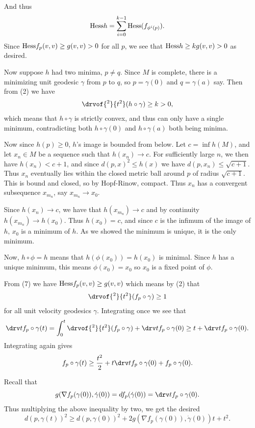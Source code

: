     And thus
    $$ {\rm Hess} h = \sum_{i=0}^{k-1}{\rm Hess}(f_{\phi^i(p)}) . $$
    Since ${\rm Hess} f_p(v,v)\geq g(v,v)>0$ for all $p$, we see that ${\rm Hess} h\geq kg(v,v)>0$ as desired.

    Now suppose $h$ had two minima, $p\neq q$.
    Since $M$ is complete, there is a minimizing unit geodesic $\gamma$ from $p$ to $q$, so $p=\gamma(0)$ and $q=\gamma(a)$
    say.
    Then from (2) we have
    $$ \drvof{^2}{t^2}(h\circ\gamma) \geq k > 0 , $$
    which means that $h\circ\gamma$ is strictly convex, and thus can only have a single minimum,
    contradicting both $h\circ\gamma(0)$ and $h\circ\gamma(a)$ both being minima.

    Now since $h(p)\geq0$, $h$'s image is bounded from below.
    Let $c=\inf h(M)$, and let $x_n\in M$ be a sequence such that $h(x_n)\to c$.
    For sufficiently large $n$, we then have $h(x_n)<c+1$, and since $d(p,x)^2\leq h(x)$ we have $d(p,x_n)\leq\sqrt{c+1}$.
    Thus $x_n$ eventually lies within the closed metric ball around $p$ of radius $\sqrt{c+1}$.
    This is bound and closed, so by Hopf-Rinow, compact.
    Thus $x_n$ has a convergent subsequence $x_{m_n}$, say $x_{m_n}\to x_0$.

    Since $h(x_n)\to c$, we have that $h(x_{m_n})\to c$ and by continuity $h(x_{m_n})\to h(x_0)$.
    Thus $h(x_0)=c$, and since $c$ is the infimum of the image of $h$, $x_0$ is a minimum of $h$.
    As we showed the minimum is unique, it is the only minimum.

    Now, $h\circ\phi=h$ means that $h(\phi(x_0))=h(x_0)$ is minimal.
    Since $h$ has a unique minimum, this means $\phi(x_0)=x_0$ so $x_0$ is a fixed point of $\phi$.

    \item From (7) we have ${\rm Hess} f_p(v,v)\geq g(v,v)$ which means by (2) that
    $$ \drvof{^2}{t^2}(f_p\circ\gamma) \geq 1 $$
    for all unit velocity geodesics $\gamma$.
    Integrating once we see that
    $$ \drv tf_p\circ\gamma(t) = \int_0^t\drvof{^2}{t^2}(f_p\circ\gamma) + \drv tf_p\circ\gamma(0) \geq t +
    \drv tf_p\circ\gamma(0) . $$
    Integrating again gives
    $$ f_p\circ\gamma(t) \geq \frac{t^2}2 + t\drv tf_p\circ\gamma(0) + f_p\circ\gamma(0) . $$

    Recall that
    $$ g(\nabla f_p(\gamma(0)),\dot\gamma(0)) = df_p(\dot\gamma(0)) = \drv tf_p\circ\gamma(0) . $$
    Thus multiplying the above inequality by two, we get the desired
    $$ d(p,\gamma(t))^2 \geq d(p,\gamma(0))^2 + 2g(\nabla f_p(\gamma(0)),\dot\gamma(0))t + t^2 . $$
 
